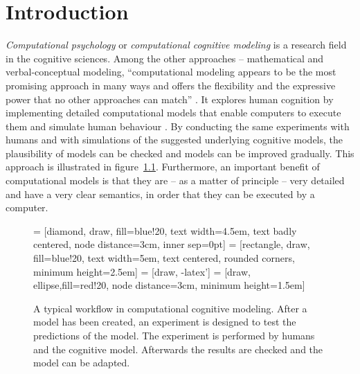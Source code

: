 \chapter{Introduction}

\emph{Computational psychology} or \emph{computational cognitive modeling} is a research field in the cognitive sciences. Among the other approaches -- mathematical and verbal-conceptual modeling, ``computational modeling appears to be the most promising approach in many ways and offers the flexibility and the expressive power that no other approaches can match'' \cite[vii]{sun_introduction_2008}. It explores human cognition by implementing detailed computational models that enable computers to execute them and simulate human behaviour \cite[3]{sun_introduction_2008}. By conducting the same experiments with humans and with simulations of the suggested underlying cognitive models, the plausibility of models can be checked and models can be improved gradually. This approach is illustrated in figure~\ref{fig:cognitive_modeling_exp}. Furthermore, an important benefit of computational models is that they are -- as a matter of principle -- very detailed and have a very clear semantics, in order that they can be executed by a computer. 

\begin{figure}[hbt]
\centering
 = [diamond, draw, fill=blue!20, 
    text width=4.5em, text badly centered, node distance=3cm, inner sep=0pt]
 = [rectangle, draw, fill=blue!20, 
    text width=5em, text centered, rounded corners, minimum height=2.5em]
 = [draw, -latex']
 = [draw, ellipse,fill=red!20, node distance=3cm,
    minimum height=1.5em]
    
\caption{A typical workflow in computational cognitive modeling. After a model has been created, an experiment is designed to test the predictions of the model. The experiment is performed by humans and the cognitive model. Afterwards the results are checked and the model can be adapted. \cite{about_actr_homepage}}
\label{fig:cognitive_modeling_exp}
\end{figure}


